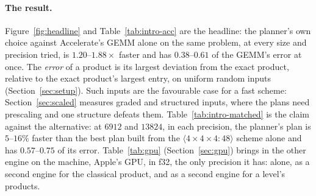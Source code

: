 \documentclass[11pt]{article}
\newcommand{\mm}[1]{\langle #1\rangle}
\begin{document}
\paragraph{The result.}
Figure~\ref{fig:headline} and Table~\ref{tab:intro-acc} are the headline: the
planner's own choice against Accelerate's GEMM alone on the same problem, at
every size and precision tried, is $1.20$--$1.88\times$ faster and has
$0.38$--$0.61$ of the GEMM's error at once.  The \emph{error} of a product
is its largest deviation from the exact product, relative to the exact
product's largest entry, on uniform random inputs
(Section~\ref{sec:setup}).  Such inputs are the favourable case for a fast
scheme: Section~\ref{sec:scaled} measures graded and structured inputs,
where the plans need prescaling and one structure defeats them.
Table~\ref{tab:intro-matched} is the claim against the alternative: at
$6912$ and $13824$, in each precision, the planner's plan is $5$--$16\%$
faster than the best plan built from the $\mm{4\times4\times4:48}$ scheme
alone and has $0.57$--$0.75$ of its error.  Table~\ref{tab:gpu}
(Section~\ref{sec:gpu}) brings in the other engine on the machine, Apple's
GPU, in f32, the only precision it has: alone, as a second engine for the
classical product, and as a second engine for a level's products.
\end{document}
